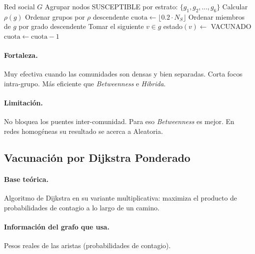 \documentclass[spanish,notitlepage,letterpaper, 12pt]{article}
\begin{document}
\begin{algorithm}[H]
\caption{Vacunaci\'on por Comunidades}
\begin{algorithmic}[1]
\Require Red social $G$
\State Agrupar nodos SUSCEPTIBLE por estrato: $\{g_1, g_2, \ldots, g_6\}$
    \State Calcular $\rho(g)$
\EndFor
\State Ordenar grupos por $\rho$ descendente
\State $\text{cuota} \gets \lfloor 0.2 \cdot N_S \rfloor$ 
    \State Ordenar miembros de $g$ por grado descendente
        \State Tomar el siguiente $v \in g$
        \State estado$(v) \gets$ VACUNADO
        \State $\text{cuota} \gets \text{cuota} - 1$
    \EndWhile
\EndFor
\end{algorithmic}
\end{algorithm}

\paragraph{Fortaleza.} Muy efectiva cuando las comunidades son densas y bien separadas. Corta focos intra-grupo. M\'as eficiente que \textit{Betweenness} e \textit{Hibrida}.

\paragraph{Limitaci\'on.} No bloquea los puentes inter-comunidad. Para eso \textit{Betweenness} es mejor. En redes homog\'eneas su resultado se acerca a Aleatoria.

\subsection{Vacunaci\'on por Dijkstra Ponderado}
\label{sec:dijkstra}

\paragraph{Base te\'orica.} Algoritmo de Dijkstra en su variante multiplicativa: maximiza el producto de probabilidades de contagio a lo largo de un camino.

\paragraph{Informaci\'on del grafo que usa.} Pesos reales de las aristas (probabilidades de contagio).
\end{document}

